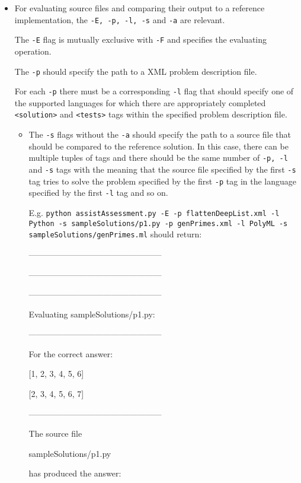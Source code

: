 \documentclass[a4paper,12pt]{article}
\begin{document}
\begin{itemize}
 
 \item
 
 For evaluating source files and comparing their output to a reference implementation, the \texttt{-E, -p, -l, -s} and \texttt{-a} are relevant.
 
 The \texttt{-E} flag is mutually exclusive with \texttt{-F} and specifies the evaluating operation. 

 The \texttt{-p} should specify the path to a XML problem description file. 

 For each \texttt{-p} there must be a corresponding \texttt{-l} flag that should specify one of the supported languages for which there are appropriately completed \texttt{<solution>} and \texttt{<tests>} tags within the specified problem description file.

 
 \begin{itemize}
  \item 
  
 The \texttt{-s} flags without the \texttt{-a} should specify the path to a source file that should be compared to the reference solution. In this case, there can be multiple tuples of tags and  there should be the same number of \texttt{-p, -l} and \texttt{-s} tags with the meaning that the source file specified by the first \texttt{-s} tag tries to solve the problem specified by the first \texttt{-p} tag in the language specified by the first \texttt{-l} tag and so on.

E.g. \texttt{python assistAssessment.py -E -p flattenDeepList.xml -l Python -s sampleSolutions/p1.py -p genPrimes.xml -l PolyML -s sampleSolutions/genPrimes.ml} should return:

------------------------------------------------

------------------------------------------------

------------------------------------------------

        Evaluating sampleSolutions/p1.py:

------------------------------------------------

For the correct answer:

[1, 2, 3, 4, 5, 6]

[2, 3, 4, 5, 6, 7]

------------------------------------------------

The source file 

        sampleSolutions/p1.py

has produced the answer:


\end{itemize}
\end{itemize}
\end{document}
